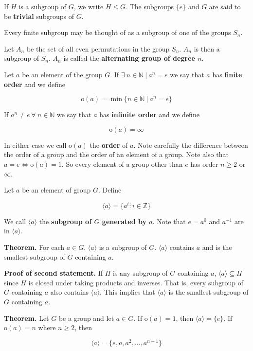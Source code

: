 \documentclass{article}
\begin{document}
If \(H\) is a subgroup of \(G\), we write \(H \leq G\). The subgroups \(\{e\}\) and \(G\) are said to be \textbf{trivial} subgroups of \(G\).

Every finite subgroup may be thought of as a subgroup of one of the groups \(S_n\).

Let \(A_n\) be the set of all even permutations in the group \(S_n\). \(A_n\) is then a subgroup of \(S_n\). \(A_n\) is called the \textbf{alternating group of degree \(n\)}.

Let \(a\) be an element of the group \(G\). If \(\exists \ n \in \mathbb{N} \ | \ a^n = e\) we say that \(a\) has \textbf{finite order} and we define

\[
\text{o}(a) = \min \{n \in \mathbb{N} \ | \ a^n = e\}
\]

If \(a^n \neq e \ \forall \ n \in \mathbb{N}\) we say that \(a\) has \textbf{infinite order} and we define

\[
\text{o}(a) = \infty
\]

In either case we call \(\text{o}(a)\) the \textbf{order} of \(a\). Note carefully the difference between the order of a group and the order of an element of a group. Note also that \(a = e \iff \text{o}(a) = 1\). So every element of a group other than \(e\) has order \(n \geq 2\) or \(\infty\).

Let \(a\) be an element of group \(G\). Define

\[
\langle a \rangle = \{a^i  : i \in \mathbb{Z} \}
\]

We call \(\langle a \rangle\) the \textbf{subgroup of \(G\) generated by \(a\)}. Note that \(e = a^0\) and \(a^{-1}\) are in \(\langle a \rangle\).

\textbf{Theorem.} For each \(a \in G\), \(\langle a \rangle\) is a subgroup of \(G\). \(\langle a \rangle\) contains \(a\) and is the smallest subgroup of \(G\) containing \(a\). 

\textbf{Proof of second statement.} If \(H\) is any subgroup of \(G\) containing \(a\), \(\langle a \rangle \subseteq H \) since \(H\) is closed under taking products and inverses. That is, every subgroup of \(G\) containing \(a\) also contains \(\langle a \rangle\). This implies that \(\langle a \rangle\) is the smallest subgroup of \(G\) containing \(a\).

\pagebreak 
\textbf{Theorem.} Let \(G\) be a group and let \(a \in G\). If \(\text{o}(a) = 1\), then \(\langle a \rangle = \{e \}\). If \(\text{o}(a) = n\) where \(n \geq 2\), then

\[
\langle a \rangle = \{e, a, a^2, \ldots, a^{n-1} \}
\]
\end{document}
